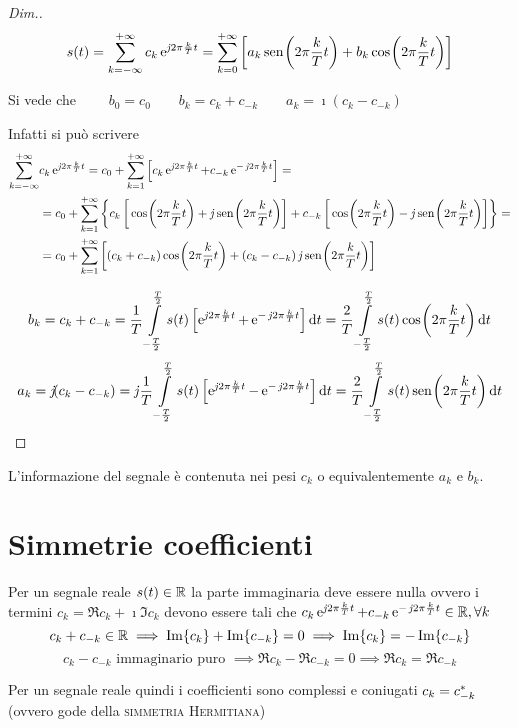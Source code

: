 \begin{proof}[Dim.]
\[s(t)=\sum_{k=-\infty}^{+\infty} c_k \operatorname{e}^{\operatorname{\mathit{j}\!} 2\pi\frac{k}{T}t} = \sum_{k=0}^{+\infty}\left[ a_k \,{\operatorname{sen}}^{}\!\left({2\pi\frac{k}{T}t}\right) + b_k \,{\operatorname{cos}}^{}\!\left({2\pi\frac{k}{T}t}\right)\right]
\]

Si vede che $\qquad b_0=c_0 \qquad b_k=c_k+c_{-k} \qquad a_k=\imath (c_k-c_{-k})$

Infatti si può scrivere
\begin{align*}
\sum_{k=-\infty}^{+\infty} & c_k \e{\imath 2\pi\frac{k}{T}t} = c_0+ \sum_{k=1}^{+\infty} \left[ c_k \e{\imath 2\pi\frac{k}{T}t} + c_{-k} \e{-\imath 2\pi\frac{k}{T}t} \right] = \\
&= c_0 + \sum_{k=1}^{+\infty} {\left\lbrace c_k \left[\cos{2\pi\frac{k}{T}t}+\imath\sen{2\pi\frac{k}{T}t}\right]
+c_{-k}\left[\cos{2\pi\frac{k}{T}t}-\imath\sen{2\pi\frac{k}{T}t}\right] \right\rbrace}=\\
&= c_0 + \sum_{k=1}^{+\infty} {\left[(c_k+c_{-k}) \cos{2\pi\frac{k}{T}t}+
(c_k-c_{-k})\imath\sen{2\pi\frac{k}{T}t}\right] }\end{align*}

\[b_k=c_k+c_{-k}=\frac{1}{T}\int\limits_{-\frac{T}{2}}^{\frac{T}{2}}{s(t)\left[\operatorname{e}^{\operatorname{\mathit{j}\!} 2\pi\frac{k}{T}t}+\operatorname{e}^{-\operatorname{\mathit{j}\!} 2\pi\frac{k}{T}t}\right]}{\,\mathop{}\!\mathrm{d}{t}}=\frac{2}{T}\int\limits_{-\frac{T}{2}}^{\frac{T}{2}}{s(t)\,{\operatorname{cos}}^{}\!\left({2\pi\frac{k}{T}t}\right)}{\,\mathop{}\!\mathrm{d}{t}} \]
\[a_k=\operatorname{\mathit{j}\!}(c_k-c_{-k})=\operatorname{\mathit{j}\!}\frac{1}{T}\int\limits_{-\frac{T}{2}}^{\frac{T}{2}}{s(t)\left[\operatorname{e}^{\operatorname{\mathit{j}\!} 2\pi\frac{k}{T}t}-\operatorname{e}^{-\operatorname{\mathit{j}\!} 2\pi\frac{k}{T}t}\right]}{\,\mathop{}\!\mathrm{d}{t}}=\frac{2}{T}\int\limits_{-\frac{T}{2}}^{\frac{T}{2}}{s(t)\,{\operatorname{sen}}^{}\!\left({2\pi\frac{k}{T}t}\right)}{\,\mathop{}\!\mathrm{d}{t}}\]
\end{proof}

\begin{nota}L'informazione del segnale è contenuta nei pesi $c_k$ o equivalentemente $a_k$ e $b_k$.
\end{nota}

\section{Simmetrie coefficienti}
Per un segnale reale $s(t)\in\mathbb{R}$ la parte immaginaria deve essere nulla ovvero i termini $c_k=\Re{c_k} + \imath \Im{c_k}$ devono essere tali che $c_k \operatorname{e}^{\operatorname{\mathit{j}\!} 2\pi\frac{k}{T}t}+ c_{-k}\operatorname{e}^{-\operatorname{\mathit{j}\!} 2\pi\frac{k}{T}t}\in\mathbb{R},\forall k$
\[c_k+c_{-k}\in\mathbb{R} \implies \operatorname{Im}\!\left\lbrace{c_k}\right\rbrace+\operatorname{Im}\!\left\lbrace{c_{-k}}\right\rbrace=0 \implies \operatorname{Im}\!\left\lbrace{c_k}\right\rbrace=-\operatorname{Im}\!\left\lbrace{c_{-k}}\right\rbrace\]
\[c_k-c_{-k} \text{ immaginario puro } \implies \Re{c_k} -\Re{c_{-k}}=0 \implies \Re{c_k}=\Re{c_{-k}} \]

Per un segnale reale quindi i coefficienti sono complessi e coniugati $c_k={c}^\ast_{-k}$ (ovvero gode della \textsc{simmetria Hermitiana})

